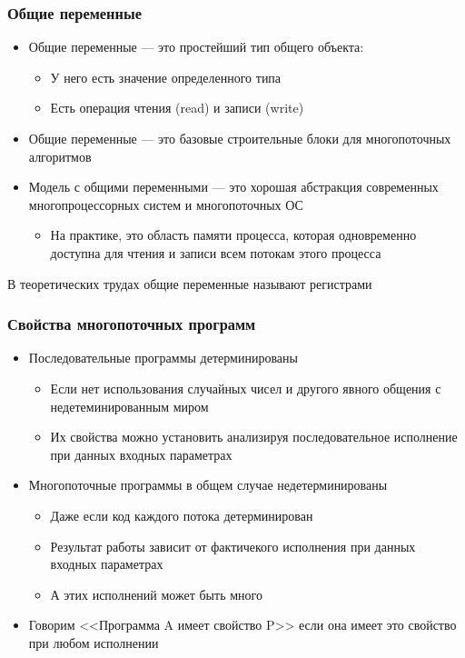 \documentclass[10pt,a4paper,oneside,titlepage]{article}
\theoremstyle{plain}
\theoremstyle{defenition}
\begin{document}
\subsubsection{Общие переменные}
\begin{itemize}
	\item Общие переменные --- это простейший тип общего объекта:
	\begin{itemize}
		\item У него есть значение определенного типа
		\item Есть операция чтения (read) и записи (write)
	\end{itemize}
    \item Общие переменные --- это базовые строительные блоки для многопоточных алгоритмов
    \item Модель с общими переменными --- это хорошая абстракция современных многопроцессорных систем и многопоточных ОС
    \begin{itemize}
    	\item На практике, это область памяти процесса, которая одновременно доступна для чтения и записи всем потокам этого процесса
    \end{itemize}
\end{itemize}

В теоретических трудах общие переменные называют регистрами

\subsubsection{Свойства многопоточных программ}
\begin{itemize}
	\item Последовательные программы детерминированы
	\begin{itemize}
		\item Если нет использования случайных чисел и другого явного общения с недетеминированным миром
		\item Их свойства можно установить анализируя последовательное исполнение при данных входных параметрах
	\end{itemize}
    \item Многопоточные программы в общем случае недетерминированы
    \begin{itemize}
    	\item Даже если код каждого потока детерминирован
    	\item Результат работы зависит от фактичекого исполнения при данных входных параметрах
    	\item А этих исполнений может быть много
    \end{itemize}
    \item Говорим <<Программа A имеет свойство P>> если она имеет это свойство при любом исполнении
\end{itemize}
\end{document}
